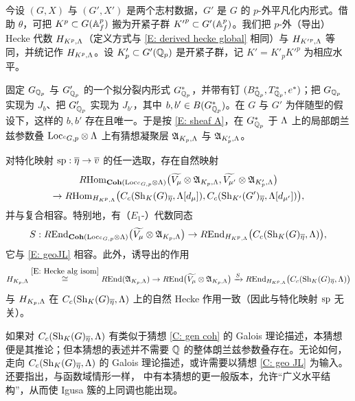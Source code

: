 今设 $(G,X)$ 与 $(G',X')$ 是两个志村数据，$G'$ 是 $G$ 的 $p$-外平凡化内形式。借助 $\theta$，可把 $K^p\subset G({\mathbb A}_f^p)$ 搬为开紧子群 ${K'}^p\subset G'({\mathbb A}_f^p)$。我们把 $p$-外（导出）Hecke 代数 $H_{K^p,{\Lambda}}$（定义方式与 \eqref{E: derived hecke global} 相同）与 $H_{{K'}^p,{\Lambda}}$ 等同，并统记作 $H_{K^p,{\Lambda}}$。设 $K'_p\subset G'({\mathbb Q}_p)$ 是开紧子群，记 $K'=K'_p{K'}^p$ 为相应水平。

固定 $G_{{\mathbb Q}_p}$ 与 $G'_{{\mathbb Q}_p}$ 的一个拟分裂内形式 $G^*_{{\mathbb Q}_p}$，并带有钉 $(B^*_{{\mathbb Q}_p},T^*_{{\mathbb Q}_p},e^*)$；把 $G_{{\mathbb Q}_p}$ 实现为 $J_b$、把 $G'_{{\mathbb Q}_p}$ 实现为 $J_{b'}$，其中 $b,b'\in B(G^*_{{\mathbb Q}_p})$。在 $G$ 与 $G'$ 为伴随型的假设下，这样的 $b,b'$ 存在且唯一。于是按 \eqref{E: sheaf A}，在 $G^*_{{\mathbb Q}_p}$ 于 ${\Lambda}$ 上的局部朗兰兹参数叠 ${\operatorname{Loc}}_{{}^cG,p}\otimes{\Lambda}$ 上有猜想凝聚层 ${\mathfrak A}_{K_p,{\Lambda}}$ 与 ${\mathfrak A}_{K'_p,{\Lambda}}$。

\begin{conj}\label{C: geo JL}
对特化映射 $\operatorname{sp}: \overline{\eta}\to \overline{v}$ 的任一选取，存在自然映射
\begin{multline}\label{E: geoJL}
R{\operatorname{Hom}}_{{\mathbf{Coh}}({\operatorname{Loc}}_{{}^cG,p}\otimes{\Lambda})}\bigl(\widetilde{V_\mu}\otimes {\mathfrak A}_{K_p,{\Lambda}}, \widetilde{V_{\mu'}}\otimes {\mathfrak A}_{K'_p,{\Lambda}}\bigr)\\
\to R{\operatorname{Hom}}_{H_{K^p,{\Lambda}}}\bigl(C_c({\operatorname{Sh}}_{K}(G)_{\overline\eta}, {\Lambda}[d_{\mu}]), C_c({\operatorname{Sh}}_{K'}(G')_{\overline\eta},{\Lambda}[d_{\mu'}])\bigr),
\end{multline}
并与复合相容。特别地，有（$E_1$-）代数同态
\begin{equation}\label{E: S operator}
S:R{\operatorname{End}}_{{\mathbf{Coh}}({\operatorname{Loc}}_{{}^cG,p}\otimes{\Lambda})}\bigl( \widetilde{V_\mu}\otimes {\mathfrak A}_{K_p,{\Lambda}}\bigr)\to R{\operatorname{End}}_{H_{K^p,{\Lambda}}}\bigl(C_c({\operatorname{Sh}}_{K}(G)_{\overline\eta},{\Lambda})\bigr),
\end{equation}
它与 \eqref{E: geoJL} 相容。此外，诱导出的作用
\begin{equation}\label{E: S action}
H_{K_p,{\Lambda}}\stackrel{\eqref{E: Hecke alg isom}}{\cong} R{\operatorname{End}}({\mathfrak A}_{K_p,{\Lambda}})\to R{\operatorname{End}}\bigl(\widetilde{V_\mu}\otimes {\mathfrak A}_{K_p,{\Lambda}}\bigr)\xrightarrow{S} R{\operatorname{End}}_{H_{K^p,{\Lambda}}}\bigl(C_c({\operatorname{Sh}}_{K}(G)_{\overline\eta},{\Lambda})\bigr)
\end{equation}
与 $H_{K_p,{\Lambda}}$ 在 $C_c({\operatorname{Sh}}_{K}(G)_{\overline\eta},{\Lambda})$ 上的自然 Hecke 作用一致（因此与特化映射 $\operatorname{sp}$ 无关）。
\end{conj}

如果对 $C_c({\operatorname{Sh}}_{K}(G)_{\overline\eta},{\Lambda})$ 有类似于猜想 \ref{C: gen coh} 的 Galois 理论描述，本猜想便是其推论；但本猜想的表述并不需要 ${\mathbb Q}$ 的整体朗兰兹参数叠存在。无论如何，走向 $C_c({\operatorname{Sh}}_{K}(G)_{\overline\eta},{\Lambda})$ 的 Galois 理论描述，或许需要以猜想 \ref{C: geo JL} 为输入。还要指出，与函数域情形一样，\cite[Sect. 4.7]{Zhu-Conjecture} 中有本猜想的更一般版本，允许“广义水平结构”，从而使 Igusa 簇的上同调也能出现。

